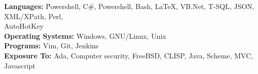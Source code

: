 

\begin{cvparagraph}

   \begin{tabbing}

      \textbf{Languages:} \hspace{5pc} \=
      Powershell, C\#, Powershell, Bash, \LaTeX, VB.Net, T-SQL, JSON, XML/XPath, Perl, \\ 
      \>AutoHotKey \\

      \textbf{Operating Systems:} \>
      Windows, GNU/Linux, Unix \\
      
      \textbf{Programs:} \>
      Vim, Git, Jenkins \\

      \textbf{Exposure To:} \>
      Ada, Computer security, FreeBSD, CLISP, Java, Scheme, MVC, Javascript

   \end{tabbing}

\end{cvparagraph}
